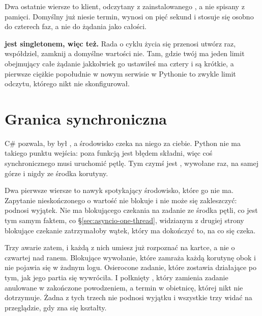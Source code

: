 Dwa ostatnie wiersze to klient, odczytany z zainstalowanego , a
nie spisany z pamięci. Domyślny  już niesie termin,
wynosi on pięć sekund i stosuje się osobno do czterech faz, a nie do
żądania jako całości.

\begin{trapbox}
\textbf{ jest singletonem, więc  też.}
Rada o cyklu życia się przenosi \dash{} utwórz raz, współdziel, zamknij
\dash{} a domyślne wartości nie. Tam, gdzie twój  ma jeden
limit obejmujący całe żądanie \dash{} jakkolwiek go ustawiłeś \dash{}
 ma cztery i są krótkie, a pierwsze ciężkie popołudnie w
nowym serwisie w Pythonie to zwykle limit odczytu, którego nikt nie
skonfigurował.
\end{trapbox}

\section{Granica synchroniczna}
\label{sec:asyncio-boundary}

C\# pozwala, by  był , a środowisko czeka na niego
za ciebie. Python nie ma takiego punktu wejścia:  poza funkcją
jest błędem składni, więc coś synchronicznego musi uruchomić pętlę. Tym
czymś jest , wywołane raz, na samej górze i nigdy ze
środka korutyny.



\noindent
Dwa pierwsze wiersze to nawyk  spotykający środowisko,
które go nie ma. Zapytanie nieskończonego  o wartość nie blokuje i nie może
się zakleszczyć: podnosi wyjątek. Nie ma blokującego czekania na zadanie ze
środka pętli, co jest tym samym faktem, co
\S\ref{sec:asyncio-one-thread}, widzianym z drugiej strony \dash{}
blokujące czekanie zatrzymałoby wątek, który ma dokończyć to, na co się
czeka.

\medskip
\noindent
Trzy awarie zatem, i każdą z nich umiesz już rozpoznać na kartce, a nie o
czwartej nad ranem. Blokujące wywołanie, które zamraża każdą korutynę obok
i nie pojawia się w żadnym logu. Osierocone zadanie, które 
zostawia działające po tym, jak jego partia się wywróciła. I połknięty
, który zamienia zadanie anulowane w zakończone
powodzeniem, a termin w obietnicę, której nikt nie dotrzymuje. Żadna z tych
trzech nie podnosi wyjątku i wszystkie trzy widać na przeglądzie, gdy zna
się kształty.
